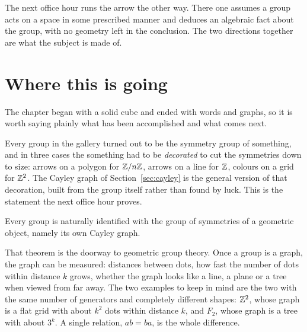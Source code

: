 \begin{lookahead}
The next office hour runs the arrow the other way. There one assumes a group acts on a space in some prescribed manner and deduces an algebraic fact about the group, with no geometry left in the conclusion. The two directions together are what the subject is made of.
\end{lookahead}

\section{Where this is going}

The chapter began with a solid cube and ended with words and graphs, so it is worth saying plainly
what has been accomplished and what comes next.

Every group in the gallery turned out to be the symmetry group of something, and in three cases the
something had to be \emph{decorated} to cut the symmetries down to size: arrows on a polygon for
$\mathbb{Z}/n\mathbb{Z}$, arrows on a line for $\mathbb{Z}$, colours on a grid for $\mathbb{Z}^2$. The Cayley graph of
Section~\ref{sec:cayley} is the general version of that decoration, built from the group itself
rather than found by luck. This is the statement the next office hour proves.

\begin{thm}[to come]
Every group is naturally identified with the group of symmetries of a geometric object, namely its
own Cayley graph.
\end{thm}

That theorem is the doorway to geometric group theory. Once a group is a graph, the graph can be
measured: distances between dots, how fast the number of dots within distance $k$ grows, whether the
graph looks like a line, a plane or a tree when viewed from far away. The two examples to keep in
mind are the two with the same number of generators and completely different shapes: $\mathbb{Z}^2$, whose
graph is a flat grid with about $k^2$ dots within distance $k$, and $F_2$, whose graph is a tree
with about $3^k$. A single relation, $ab=ba$, is the whole difference.

